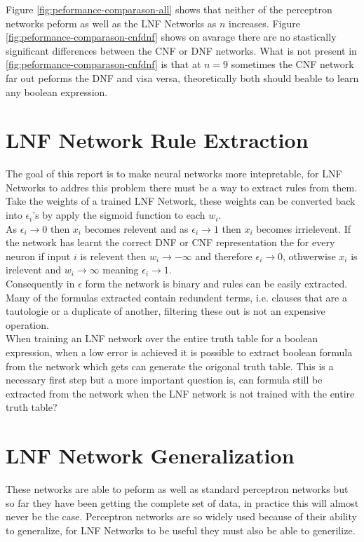 Figure  \ref{fig:peformance-comparason-all} shows that neither of the perceptron networks peform as well as the LNF Networks as $n$ increases. Figure  \ref{fig:peformance-comparason-cnfdnf} shows on avarage there are no stastically significant differences between the CNF or DNF networks. What is not present in  \ref{fig:peformance-comparason-cnfdnf} is that at $n = 9$ sometimes the CNF network far out peforms the DNF and visa versa, theoretically both should beable to learn any boolean expression. 

\section{LNF Network Rule Extraction}
The goal of this report is to make neural networks more intepretable, for LNF Networks to addres this problem there must be a way to extract rules from them. Take the weights of a trained LNF Network, these weights can be converted back into $\epsilon_i$'s by apply the sigmoid function to each $w_i$.\\

As $\epsilon_i \rightarrow 0$ then $x_i$ becomes relevent and as $\epsilon_i \rightarrow 1$ then $x_i$ becomes irrielevent. If the network has learnt the correct DNF or CNF representation the for every neuron if input $i$ is relevent then $w_i \rightarrow -\infty$ and therefore $\epsilon_i \rightarrow 0$, othwerwise $x_i$ is irelevent and  $w_i \rightarrow \infty$ meaning $\epsilon_i \rightarrow 1$.\\

Consequently in $\epsilon$ form the network is binary and rules can be easily extracted. Many of the formulas extracted contain redundent terms, i.e. clauses that are a tautologie or a duplicate of another, filtering these out is not an expensive operation.\\

When training an LNF network over the entire truth table for a boolean expression, when a low error is achieved it is possible to extract boolean formula from the network which gets can generate the origonal truth table. This is a necessary first step but a more important question is, can formula still be extracted from the network when the LNF network is not trained with the entire truth table?

\section{LNF Network Generalization}
These networks are able to peform as well as standard perceptron networks but so far they have been getting the complete set of data, in practice this will almost never be the case. Perceptron networks are so widely used because of their ability to generalize, for LNF Networks to be useful they must also be able to generilize.


